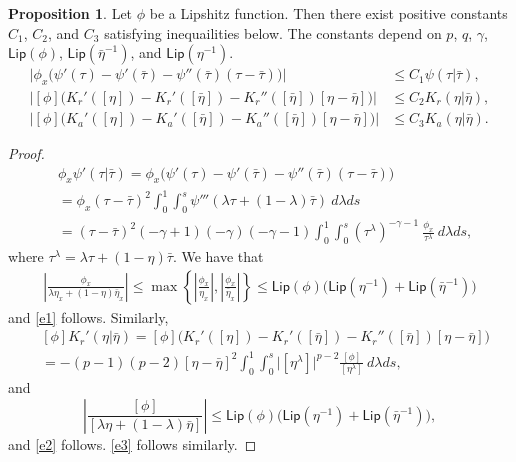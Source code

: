 \documentclass[10pt, letterpaper]{article}
\def\Lip{{\textsf{Lip}}}
\theoremstyle{definition}
\newtheorem{proposition}[subsubsection]{Proposition}
\theoremstyle{remark}
\begin{document}
\begin{proposition} \label{pp}
 Let $\phi$ be a Lipshitz function. Then there exist positive constants $C_1$, $C_2$, and $C_3$ satisfying inequailities below. The constants depend on $p$, $q$, $\gamma$, $\Lip(\phi)$, $\Lip(\bar\eta^{-1})$, and $\Lip(\eta^{-1})$. 
 \begin{align}
  \Big|\phi_x\Big(\psi'(\tau) - \psi'(\bar\tau) - \psi''(\bar\tau)(\tau - \bar\tau)\Big)\Big|  &\le C_1 \psi(\tau|\bar\tau), \label{e1}\\
  \Big|[\phi]\Big(K_r'([\eta]) - K_r'([\bar\eta]) - K_r''([\bar\eta])[\eta-\bar\eta]\Big)\Big| &\le C_2 K_r(\eta|\bar\eta), \label{e2}\\
   \Big|[\phi]\Big(K_a'([\eta]) - K_a'([\bar\eta]) - K_a''([\bar\eta])[\eta-\bar\eta]\Big)\Big| &\le C_3 K_a(\eta|\bar\eta) \label{e3}. 
 \end{align}
\end{proposition}
\begin{proof}
 \begin{align*}
  &\phi_x\psi'(\tau|\bar\tau)=\phi_x \Big(\psi'(\tau) - \psi'(\bar\tau) - \psi''(\bar\tau)(\tau - \bar\tau)\Big)\\
  &= \phi_x(\tau - \bar\tau)^2\int_0^1 \int_0^s \psi'''(\lambda \tau + (1-\lambda)\bar\tau)\: d\lambda ds\\
  &= (\tau - \bar\tau)^2(-\gamma+1)(-\gamma)(-\gamma-1) \int_0^1\int_0^s (\tau^\lambda)^{-\gamma-1}~\frac{\phi_x}{\tau^\lambda} \: d\lambda ds,
 \end{align*}
 where $\tau^\lambda = \lambda \tau + (1-\eta) \bar\tau$. We have that
\begin{align*}
 \left| \frac{\phi_x}{\lambda \eta_x + (1-\eta) \bar\eta_x} \right| \le \max \left\{ \left| \frac{\phi_x}{\eta_x}\right|, \left| \frac{\phi_x}{\bar\eta_x}\right|\right\} \le \Lip(\phi) \big( \Lip(\eta^{-1}) + \Lip(\bar\eta^{-1})\big)
\end{align*}
and \eqref{e1} follows. Similarly,
\begin{align*}
 &[\phi]K_r'(\eta | \bar\eta)=
 [\phi]\Big(K_r'([\eta]) - K_r'([\bar\eta]) - K_r''([\bar\eta])[\eta-\bar\eta]\Big)\\
 &=-(p-1)(p-2)[\eta-\bar\eta]^2\int_0^1 \int_0^s \Big|[\eta^\lambda]\Big|^{p-2} \frac{[\phi]}{[\eta^\lambda]} \:d\lambda ds,
\end{align*}
and 
$$\left|\frac{[\phi]}{[\lambda \eta + (1-\lambda)\bar\eta]} \right| \le  \Lip(\phi) \big( \Lip(\eta^{-1}) + \Lip(\bar\eta^{-1})\big),$$
and \eqref{e2} follows. \eqref{e3} follows similarly.
\end{proof}
\end{document}
